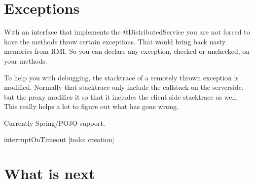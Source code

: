 \section{Exceptions}
With an interface that implements the @DistributedService you are not forced to have the methods throw certain exceptions. That would bring back nasty memories from RMI. So you can declare any exception, checked or unchecked, on your methods. 

To help you with debugging, the stacktrace of a remotely thrown exception is modified. Normally that stacktrace only include the callstack on the serverside, but the proxy modifies it so that it includes the client side stacktrace as well. This really helps a lot to figure out what has gone wrong.

Currently Spring/POJO support.

interruptOnTimeout
[todo: creation]

\section{What is next}

